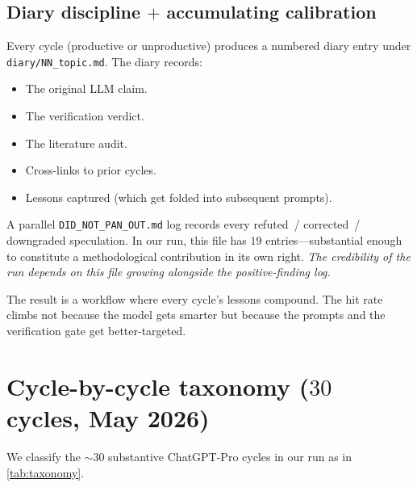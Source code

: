 \documentclass[11pt,reqno]{amsart}
\theoremstyle{definition}
\begin{document}
\subsection{Diary discipline $+$ accumulating calibration}\label{sec:diary}

Every cycle (productive or unproductive) produces a numbered diary
entry under \texttt{diary/NN\_topic.md}. The diary records:

\begin{itemize}[leftmargin=2em]
\item The original LLM claim.
\item The verification verdict.
\item The literature audit.
\item Cross-links to prior cycles.
\item Lessons captured (which get folded into subsequent prompts).
\end{itemize}

A parallel \texttt{DID\_NOT\_PAN\_OUT.md} log records every refuted~/
corrected~/ downgraded speculation. In our run, this file has $19$
entries---substantial enough to constitute a methodological
contribution in its own right. \emph{The credibility of the run
depends on this file growing alongside the positive-finding log.}

The result is a workflow where every cycle's lessons compound. The
hit rate climbs not because the model gets smarter but because the
prompts and the verification gate get better-targeted.

\section{Cycle-by-cycle taxonomy ($30$ cycles, May 2026)}\label{sec:taxonomy}

We classify the $\sim 30$ substantive ChatGPT-Pro cycles in our run
as in \cref{tab:taxonomy}.
\end{document}
